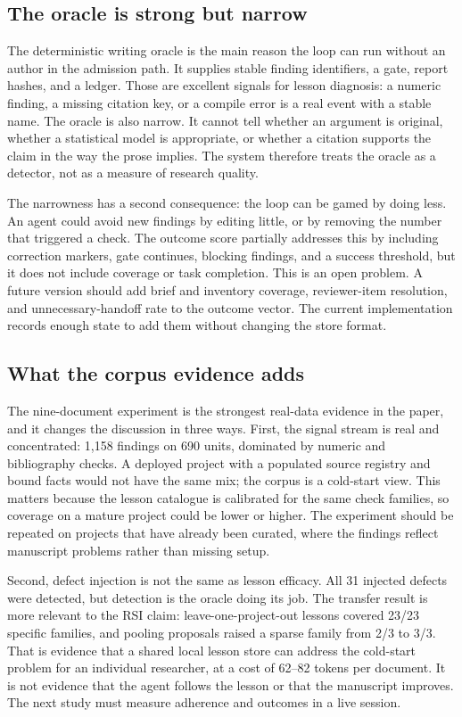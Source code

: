 \subsection{The oracle is strong but narrow}
The deterministic writing oracle is the main reason the loop can run without an author in the admission path. It supplies stable finding identifiers, a gate, report hashes, and a ledger. Those are excellent signals for lesson diagnosis: a numeric finding, a missing citation key, or a compile error is a real event with a stable name. The oracle is also narrow. It cannot tell whether an argument is original, whether a statistical model is appropriate, or whether a citation supports the claim in the way the prose implies. The system therefore treats the oracle as a detector, not as a measure of research quality.

The narrowness has a second consequence: the loop can be gamed by doing less. An agent could avoid new findings by editing little, or by removing the number that triggered a check. The outcome score partially addresses this by including correction markers, gate continues, blocking findings, and a success threshold, but it does not include coverage or task completion. This is an open problem. A future version should add brief and inventory coverage, reviewer-item resolution, and unnecessary-handoff rate to the outcome vector. The current implementation records enough state to add them without changing the store format.

\subsection{What the corpus evidence adds}
\label{sec:corpus-discussion}
The nine-document experiment is the strongest real-data evidence in the paper, and it changes the discussion in three ways. First, the signal stream is real and concentrated: 1,158 findings on 690 units, dominated by numeric and bibliography checks. A deployed project with a populated source registry and bound facts would not have the same mix; the corpus is a cold-start view. This matters because the lesson catalogue is calibrated for the same check families, so coverage on a mature project could be lower or higher. The experiment should be repeated on projects that have already been curated, where the findings reflect manuscript problems rather than missing setup.

Second, defect injection is not the same as lesson efficacy. All 31 injected defects were detected, but detection is the oracle doing its job. The transfer result is more relevant to the RSI claim: leave-one-project-out lessons covered 23/23 specific families, and pooling proposals raised a sparse family from 2/3 to 3/3. That is evidence that a shared local lesson store can address the cold-start problem for an individual researcher, at a cost of 62--82 tokens per document. It is not evidence that the agent follows the lesson or that the manuscript improves. The next study must measure adherence and outcomes in a live session.

